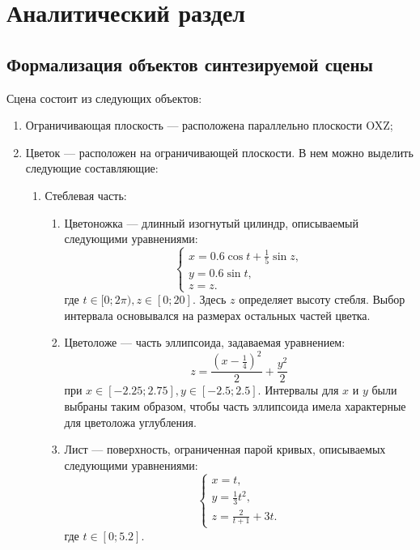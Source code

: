 \chapter{Аналитический раздел}

\section{Формализация объектов синтезируемой сцены}

Сцена состоит из следующих объектов:
\begin{enumerate}
	\item Ограничивающая плоскость --- расположена параллельно плоскости OXZ;
	\item Цветок --- расположен на ограничивающей плоскости. В нем можно выделить следующие составляющие:
	\begin{enumerate}[label*=\arabic*.]
		\item Стеблевая часть:
		\begin{enumerate}[label=\alph*)]
			\item Цветоножка --- длинный изогнутый цилиндр, описываемый следующими уравнениями:
			\begin{equation*}
				\begin{cases}
					x = 0.6\cos t + \frac{1}{5}\sin z,\\
					y = 0.6\sin t,\\
					z = z.
				\end{cases}
			\end{equation*}
			где $t \in [0;2\pi), z \in [0;20]$. 
			Здесь $z$ определяет высоту стебля. Выбор интервала основывался на размерах остальных частей цветка.
			
			\item Цветоложе --- часть эллипсоида, задаваемая уравнением:
			\begin{equation*}
				z = \frac{(x - \frac{1}{4})^2}{2} + \frac{y^2}{2}
			\end{equation*}
			при $x \in [-2.25; 2.75], y \in [-2.5;2.5]$.
			Интервалы для $x$ и $y$ были выбраны таким образом, чтобы часть эллипсоида имела характерные для цветоложа углубления.
			
			\item Лист --- поверхность, ограниченная парой кривых, описываемых следующими уравнениями:
			\begin{equation*}
				\begin{cases}
					x = t,\\
					y = \frac{1}{3}t^2,\\
					z = \frac{2}{t+1} + 3t.
				\end{cases}
			\end{equation*}
			где $t \in [0;5.2]$.
			

\end{enumerate}
\end{enumerate}
\end{enumerate}
